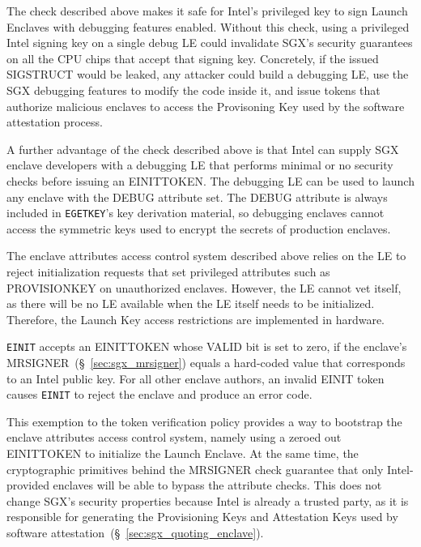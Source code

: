 The check described above makes it safe for Intel's privileged key to sign
Launch Enclaves with debugging features enabled. Without this check, using a
privileged Intel signing key on a single debug LE could invalidate SGX's
security guarantees on all the CPU chips that accept that signing key.
Concretely, if the issued SIGSTRUCT would be leaked, any attacker could build a
debugging LE, use the SGX debugging features to modify the code inside it, and
issue tokens that authorize malicious enclaves to access the Provisoning Key
used by the software attestation process.

A further advantage of the check described above is that Intel can supply SGX
enclave developers with a debugging LE that performs minimal or no security
checks before issuing an EINITTOKEN. The debugging LE can be used to launch any
enclave with the DEBUG attribute set. The DEBUG attribute is always included in
\texttt{EGETKEY}'s key derivation material, so debugging enclaves cannot access
the symmetric keys used to encrypt the secrets of production enclaves.


The enclave attributes access control system described above relies on the LE
to reject initialization requests that set privileged attributes such as
PROVISIONKEY on unauthorized enclaves. However, the LE cannot vet itself, as
there will be no LE available when the LE itself needs to be initialized.
Therefore, the Launch Key access restrictions are implemented in hardware.

\texttt{EINIT} accepts an EINITTOKEN whose VALID bit is set to zero, if
the enclave's MRSIGNER~(\S~\ref{sec:sgx_mrsigner}) equals a hard-coded value
that corresponds to an Intel public key. For all other enclave authors, an
invalid EINIT token causes \texttt{EINIT} to reject the enclave and produce an
error code.

This exemption to the token verification policy provides a way to bootstrap the
enclave attributes access control system, namely using a zeroed out EINITTOKEN
to initialize the Launch Enclave. At the same time, the cryptographic
primitives behind the MRSIGNER check guarantee that only Intel-provided
enclaves will be able to bypass the attribute checks. This does not change
SGX's security properties because Intel is already a trusted party, as it is
responsible for generating the Provisioning Keys and Attestation Keys used by
software attestation~(\S~\ref{sec:sgx_quoting_enclave}).

